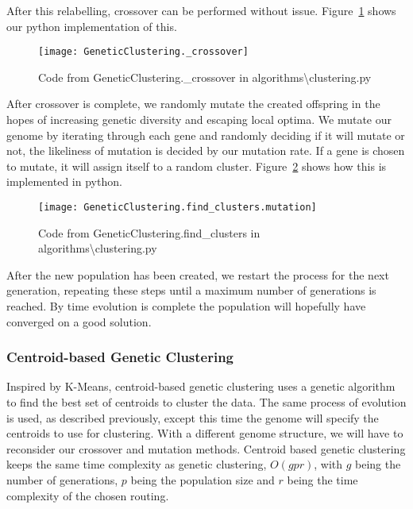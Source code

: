 \noindent
After this relabelling, crossover can be performed without issue.
Figure~\ref{fig:GeneticClustering._crossover} shows our python implementation of this.
\begin{figure}[H]
    \centering
    \texttt{[image: GeneticClustering.\_crossover]}
    \caption{Code from GeneticClustering.\_crossover in algorithms\textbackslash clustering.py}
    \label{fig:GeneticClustering._crossover}
\end{figure}

After crossover is complete, we randomly mutate the created offspring in the hopes of increasing genetic diversity
and escaping local optima.
We mutate our genome by iterating through each gene and randomly deciding if it will mutate or not, the likeliness
of mutation is decided by our mutation rate.
If a gene is chosen to mutate, it will assign itself to a random cluster.
Figure~\ref{fig:GeneticClustering.find_clusters.mutation} shows how this is implemented in python.
\begin{figure}[H]
    \centering
    \texttt{[image: GeneticClustering.find\_clusters.mutation]}
    \caption{Code from GeneticClustering.find\_clusters in algorithms\textbackslash clustering.py}
    \label{fig:GeneticClustering.find_clusters.mutation}
\end{figure}

\noindent
After the new population has been created, we restart the process for the next generation, repeating these steps
until a maximum number of generations is reached.
By time evolution is complete the population will hopefully have converged on a good solution.

\noindent
{}

\subsubsection{Centroid-based Genetic Clustering}
Inspired by K-Means, centroid-based genetic clustering uses a genetic algorithm to find the best set of centroids
to cluster the data.
The same process of evolution is used, as described previously, except this time the genome will specify the
centroids to use for clustering.
With a different genome structure, we will have to reconsider our crossover and mutation methods.
Centroid based genetic clustering keeps the same time complexity as genetic clustering, $O(gpr)$, with $g$ being the
number of generations, $p$ being the population size and $r$ being the time complexity of the chosen routing.\\

